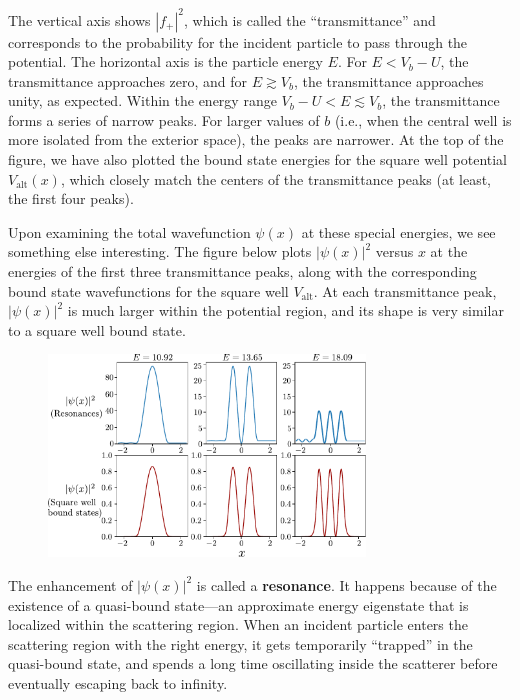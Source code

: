 \documentclass[pra,12pt]{revtex4}
\begin{document}
The vertical axis shows $|f_+|^2$, which is called the
``transmittance'' and corresponds to the probability for the incident
particle to pass through the potential.  The horizontal axis is the
particle energy $E$.  For $E < V_b-U$, the transmittance approaches
zero, and for $E \gtrsim V_b$, the transmittance approaches unity, as
expected.  Within the energy range $V_b-U < E \lesssim V_b$, the
transmittance forms a series of narrow peaks.  For larger values of
$b$ (i.e., when the central well is more isolated from the exterior
space), the peaks are narrower.  At the top of the figure, we have
also plotted the bound state energies for the square well potential
$V_{\mathrm{alt}}(x)$, which closely match the centers of the
transmittance peaks (at least, the first four peaks).

Upon examining the total wavefunction $\psi(x)$ at these special
energies, we see something else interesting.  The figure below plots
$|\psi(x)|^2$ versus $x$ at the energies of the first three
transmittance peaks, along with the corresponding bound state
wavefunctions for the square well $V_{\mathrm{alt}}$.  At each
transmittance peak, $|\psi(x)|^2$ is much larger within the potential
region, and its shape is very similar to a square well bound state.

\begin{figure}[h]
  \centering\includegraphics[width=0.75\textwidth]{resonancewavefunctions}
\end{figure}

The enhancement of $|\psi(x)|^2$ is called a \textbf{resonance}.  It
happens because of the existence of a quasi-bound state---an
approximate energy eigenstate that is localized within the scattering
region.  When an incident particle enters the scattering region with
the right energy, it gets temporarily ``trapped'' in the quasi-bound
state, and spends a long time oscillating inside the scatterer before
eventually escaping back to infinity.
\end{document}
